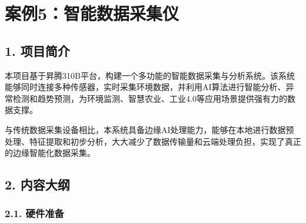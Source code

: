 \chapter{案例5：智能数据采集仪}\label{ux6848ux4f8b5ux667aux80fdux6570ux636eux91c7ux96c6ux4eea}

\section{1. 项目简介}\label{ux9879ux76eeux7b80ux4ecb}

本项目基于昇腾310B平台，构建一个多功能的智能数据采集与分析系统。该系统能够同时连接多种传感器，实时采集环境数据，并利用AI算法进行智能分析、异常检测和趋势预测，为环境监测、智慧农业、工业4.0等应用场景提供强有力的数据支撑。

与传统数据采集设备相比，本系统具备边缘AI处理能力，能够在本地进行数据预处理、特征提取和初步分析，大大减少了数据传输量和云端处理负担，实现了真正的边缘智能化数据采集。

\section{2. 内容大纲}\label{ux5185ux5bb9ux5927ux7eb2}

\subsection{2.1. 硬件准备}\label{ux786cux4ef6ux51c6ux5907}

